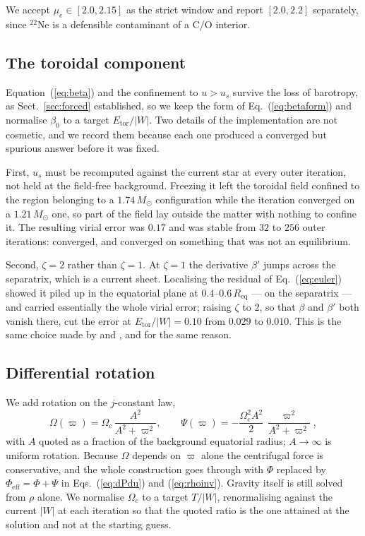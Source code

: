 \documentclass{aa}
\begin{document}
We accept $\mu_e \in [2.0, 2.15]$ as the strict window and report
$[2.0, 2.2]$ separately, since $^{22}$Ne is a defensible contaminant of a
C/O interior.

\subsection{The toroidal component}
\label{sec:toroidal}

Equation~(\ref{eq:beta}) and the confinement to $u > u_s$ survive the
loss of barotropy, as Sect.~\ref{sec:forced} established, so we keep the
form of Eq.~(\ref{eq:betaform}) and normalise $\beta_0$ to a target
$E_{\mathrm{tor}}/|W|$. Two details of the implementation are not
cosmetic, and we record them because each one produced a converged but
spurious answer before it was fixed.

First, $u_s$ must be recomputed against the current star at every outer
iteration, not held at the field-free background. Freezing it left the
toroidal field confined to the region belonging to a $1.74\,M_\odot$
configuration while the iteration converged on a $1.21\,M_\odot$ one, so
part of the field lay outside the matter with nothing to confine it. The
resulting virial error was $0.17$ and was stable from $32$ to $256$ outer
iterations: converged, and converged on something that was not an
equilibrium.

Second, $\zeta = 2$ rather than $\zeta = 1$. At $\zeta = 1$ the
derivative $\beta'$ jumps across the separatrix, which is a current
sheet. Localising the residual of Eq.~(\ref{eq:euler}) showed it piled up
in the equatorial plane at $0.4$--$0.6\,R_{\mathrm{eq}}$ --- on the
separatrix --- and carried essentially the whole virial error; raising
$\zeta$ to $2$, so that $\beta$ and $\beta'$ both vanish there, cut the
error at $E_{\mathrm{tor}}/|W| = 0.10$ from $0.029$ to $0.010$. This is
the same choice made by \citet{ciolfi2013} and \citet{lander2009}, and
for the same reason.

\subsection{Differential rotation}
\label{sec:rotation}

We add rotation on the $j$-constant law,
\begin{equation}
\Omega(\varpi) = \Omega_c\,\frac{A^2}{A^2 + \varpi^2} ,
\qquad
\Psi(\varpi) = -\frac{\Omega_c^2 A^2}{2}\,
               \frac{\varpi^2}{A^2 + \varpi^2} ,
\label{eq:rot}
\end{equation}
with $A$ quoted as a fraction of the background equatorial radius;
$A \to \infty$ is uniform rotation. Because $\Omega$ depends on $\varpi$
alone the centrifugal force is conservative, and the whole construction
goes through with $\Phi$ replaced by $\Phi_{\mathrm{eff}} = \Phi + \Psi$
in Eqs.~(\ref{eq:dPdu}) and (\ref{eq:rhoinv}). Gravity itself is still
solved from $\rho$ alone. We normalise $\Omega_c$ to a target
$T/|W|$, renormalising against the current $|W|$ at each iteration so
that the quoted ratio is the one attained at the solution and not at the
starting guess.
\end{document}
